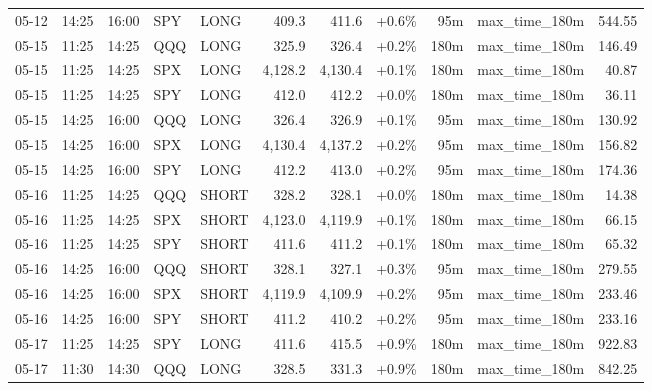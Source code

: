 \documentclass[11pt,a4paper,twoside]{article}
\begin{document}
\begin{center}
\begin{longtable}{>{\color{txtmain}}l l l l l r r r r >{\color{txtmain}}l r}
05-12 & 14:25 & 16:00 & SPY & LONG & 409.3 & 411.6 & \textcolor{wingreen}{+0.6\%} & 95m & max\_time\_180m & \textcolor{wingreen}{544.55} \\
05-15 & 11:25 & 14:25 & QQQ & LONG & 325.9 & 326.4 & \textcolor{wingreen}{+0.2\%} & 180m & max\_time\_180m & \textcolor{wingreen}{146.49} \\
05-15 & 11:25 & 14:25 & SPX & LONG & 4,128.2 & 4,130.4 & \textcolor{wingreen}{+0.1\%} & 180m & max\_time\_180m & \textcolor{wingreen}{40.87} \\
05-15 & 11:25 & 14:25 & SPY & LONG & 412.0 & 412.2 & \textcolor{wingreen}{+0.0\%} & 180m & max\_time\_180m & \textcolor{wingreen}{36.11} \\
05-15 & 14:25 & 16:00 & QQQ & LONG & 326.4 & 326.9 & \textcolor{wingreen}{+0.1\%} & 95m & max\_time\_180m & \textcolor{wingreen}{130.92} \\
05-15 & 14:25 & 16:00 & SPX & LONG & 4,130.4 & 4,137.2 & \textcolor{wingreen}{+0.2\%} & 95m & max\_time\_180m & \textcolor{wingreen}{156.82} \\
05-15 & 14:25 & 16:00 & SPY & LONG & 412.2 & 413.0 & \textcolor{wingreen}{+0.2\%} & 95m & max\_time\_180m & \textcolor{wingreen}{174.36} \\
05-16 & 11:25 & 14:25 & QQQ & SHORT & 328.2 & 328.1 & \textcolor{wingreen}{+0.0\%} & 180m & max\_time\_180m & \textcolor{wingreen}{14.38} \\
05-16 & 11:25 & 14:25 & SPX & SHORT & 4,123.0 & 4,119.9 & \textcolor{wingreen}{+0.1\%} & 180m & max\_time\_180m & \textcolor{wingreen}{66.15} \\
05-16 & 11:25 & 14:25 & SPY & SHORT & 411.6 & 411.2 & \textcolor{wingreen}{+0.1\%} & 180m & max\_time\_180m & \textcolor{wingreen}{65.32} \\
05-16 & 14:25 & 16:00 & QQQ & SHORT & 328.1 & 327.1 & \textcolor{wingreen}{+0.3\%} & 95m & max\_time\_180m & \textcolor{wingreen}{279.55} \\
05-16 & 14:25 & 16:00 & SPX & SHORT & 4,119.9 & 4,109.9 & \textcolor{wingreen}{+0.2\%} & 95m & max\_time\_180m & \textcolor{wingreen}{233.46} \\
05-16 & 14:25 & 16:00 & SPY & SHORT & 411.2 & 410.2 & \textcolor{wingreen}{+0.2\%} & 95m & max\_time\_180m & \textcolor{wingreen}{233.16} \\
05-17 & 11:25 & 14:25 & SPY & LONG & 411.6 & 415.5 & \textcolor{wingreen}{+0.9\%} & 180m & max\_time\_180m & \textcolor{wingreen}{922.83} \\
05-17 & 11:30 & 14:30 & QQQ & LONG & 328.5 & 331.3 & \textcolor{wingreen}{+0.9\%} & 180m & max\_time\_180m & \textcolor{wingreen}{842.25} \\

\end{longtable}
\end{center}
\end{document}
